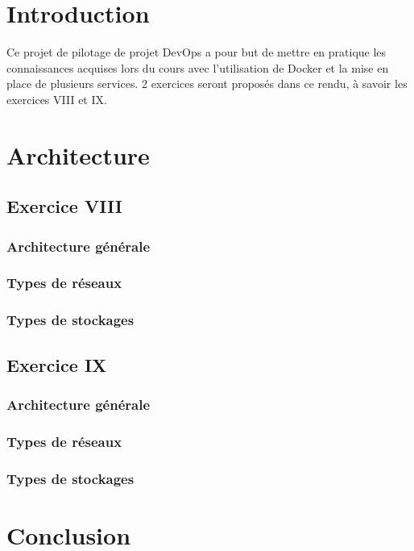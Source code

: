 \section{Introduction}
Ce projet de pilotage de projet DevOps a pour but de mettre en pratique les connaissances acquises lors du cours avec l'utilisation de Docker et la mise en place de plusieurs services. 2 exercices seront proposés dans ce rendu, à savoir les exercices VIII et IX.

\section{Architecture}
\subsection{Exercice VIII}
\subsubsection*{Architecture générale}
\subsubsection*{Types de réseaux}
\subsubsection*{Types de stockages}

\subsection{Exercice IX}
\subsubsection*{Architecture générale}
\subsubsection*{Types de réseaux}
\subsubsection*{Types de stockages}

\section{Conclusion}